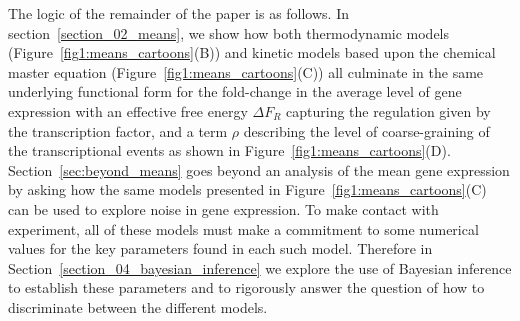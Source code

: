 The logic of the remainder of the paper is as follows. In
section~\ref{section_02_means}, we show how both thermodynamic models
(Figure~\ref{fig1:means_cartoons}(B)) and kinetic models based upon the chemical
master equation (Figure~\ref{fig1:means_cartoons}(C)) all culminate in the same
underlying functional form for the fold-change in the average level of gene
expression with an effective free energy $\Delta F_R$ capturing the regulation
given by the transcription factor, and a term $\rho$ describing the level of
coarse-graining of the transcriptional events as shown in
Figure~\ref{fig1:means_cartoons}(D). Section~\ref{sec:beyond_means} goes beyond
an analysis of the mean gene expression by asking how the same models presented
in Figure~\ref{fig1:means_cartoons}(C) can be used to explore noise in gene
expression. To make contact with experiment, all of these models must make a
commitment to some numerical values for the key parameters found in each such
model. Therefore in Section~\ref{section_04_bayesian_inference} we explore the
use of Bayesian inference to establish these parameters and to rigorously answer
the question of how to discriminate between the different models.